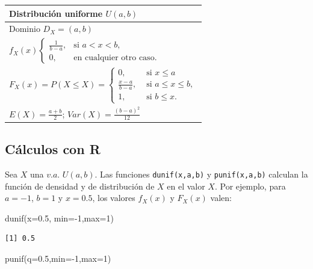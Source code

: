 \documentclass[
  letterpaper,
  DIV=11,
  numbers=noendperiod]{scrreprt}
\newenvironment{Shaded}{\begin{snugshade}}{\end{snugshade}}
\newcommand{\AttributeTok}[1]{\textcolor[rgb]{0.40,0.45,0.13}{#1}}
\newcommand{\DecValTok}[1]{\textcolor[rgb]{0.68,0.00,0.00}{#1}}
\newcommand{\FloatTok}[1]{\textcolor[rgb]{0.68,0.00,0.00}{#1}}
\newcommand{\FunctionTok}[1]{\textcolor[rgb]{0.28,0.35,0.67}{#1}}
\newcommand{\NormalTok}[1]{\textcolor[rgb]{0.00,0.23,0.31}{#1}}
\newcommand{\SpecialCharTok}[1]{\textcolor[rgb]{0.37,0.37,0.37}{#1}}
\begin{document}
\renewcommand{\arraystretch}{1.8}
\begin{table}
\centering
\begin{tabular}{|l|}
\hline\rowcolor{LightBlue}
Distribución uniforme $U(a,b)$
\\\hline
Dominio $D_X=(a,b)$\\\hline
$f_{X}(x)\left\{\begin{array}{ll}\frac1{b-a}, & \mbox{si } a<x<b,\\ 0, & \mbox{en cualquier otro caso.}\end{array} \right.$\\\hline
$F_X(x)=P(X\leq X)=\left\{\begin{array}{ll} 0, & \mbox{ si } x\leq a\\\frac{x-a}{b-a}, & \mbox{ si } a\leq x\leq b,\\1, & \mbox{ si } b\leq x.\end{array}\right.$\\\hline
$E(X)=\frac{a+b}2$; $Var(X)=\frac{(b-a)^2}{12}$
\\\hline
\end{tabular}
\end{table}

\subsection{Cálculos con R}\label{cuxe1lculos-con-r-3}

Sea \(X\) una \(v.a.\) \(U(a,b)\). Las funciones \texttt{dunif(x,a,b)} y
\texttt{punif(x,a,b)} calculan la función de densidad y de distribución
de \(X\) en el valor \(X\). Por ejemplo, para \(a=-1\), \(b=1\) y
\(x=0.5\), los valores \(f_X(x)\) y \(F_X(x)\) valen:

\begin{Shaded}
\begin{Highlighting}[]
\FunctionTok{dunif}\NormalTok{(}\AttributeTok{x=}\FloatTok{0.5}\NormalTok{, }\AttributeTok{min=}\SpecialCharTok{{-}}\DecValTok{1}\NormalTok{,}\AttributeTok{max=}\DecValTok{1}\NormalTok{)}
\end{Highlighting}
\end{Shaded}

\begin{verbatim}
[1] 0.5
\end{verbatim}

\begin{Shaded}
\begin{Highlighting}[]
\FunctionTok{punif}\NormalTok{(}\AttributeTok{q=}\FloatTok{0.5}\NormalTok{,}\AttributeTok{min=}\SpecialCharTok{{-}}\DecValTok{1}\NormalTok{,}\AttributeTok{max=}\DecValTok{1}\NormalTok{)}
\end{Highlighting}
\end{Shaded}
\end{document}
